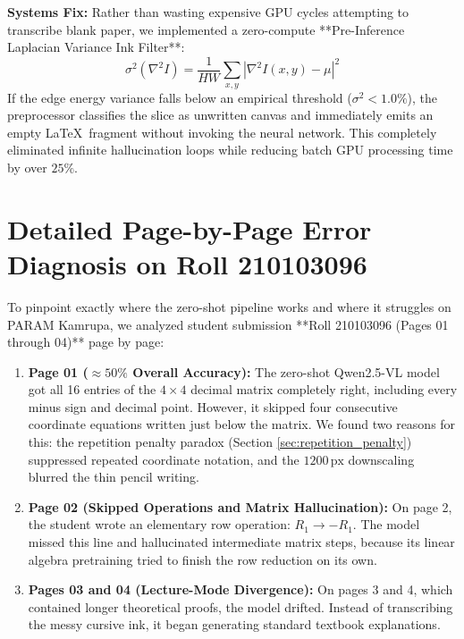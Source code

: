 \textbf{Systems Fix:} Rather than wasting expensive GPU cycles attempting to transcribe blank paper, we implemented a zero-compute **Pre-Inference Laplacian Variance Ink Filter**:
\begin{equation}
\sigma^2(\nabla^2 I) = \frac{1}{HW} \sum_{x,y} \left| \nabla^2 I(x,y) - \mu \right|^2
\end{equation}
If the edge energy variance falls below an empirical threshold ($\sigma^2 < 1.0\%$), the preprocessor classifies the slice as unwritten canvas and immediately emits an empty \LaTeX\ fragment without invoking the neural network. This completely eliminated infinite hallucination loops while reducing batch GPU processing time by over $25\%$.

\section{Detailed Page-by-Page Error Diagnosis on Roll 210103096}
\label{sec:zero_shot_diagnosis}

To pinpoint exactly where the zero-shot pipeline works and where it struggles on PARAM Kamrupa, we analyzed student submission **Roll 210103096 (Pages 01 through 04)** page by page:

\begin{enumerate}
    \item \textbf{Page 01 ($\approx 50\%$ Overall Accuracy):} The zero-shot Qwen2.5-VL model got all 16 entries of the $4 \times 4$ decimal matrix completely right, including every minus sign and decimal point. However, it skipped four consecutive coordinate equations written just below the matrix. We found two reasons for this: the repetition penalty paradox (Section \ref{sec:repetition_penalty}) suppressed repeated coordinate notation, and the $1200\,\text{px}$ downscaling blurred the thin pencil writing.
    \item \textbf{Page 02 (Skipped Operations and Matrix Hallucination):} On page 2, the student wrote an elementary row operation: $R_1 \to -R_1$. The model missed this line and hallucinated intermediate matrix steps, because its linear algebra pretraining tried to finish the row reduction on its own.
    \item \textbf{Pages 03 and 04 (Lecture-Mode Divergence):} On pages 3 and 4, which contained longer theoretical proofs, the model drifted. Instead of transcribing the messy cursive ink, it began generating standard textbook explanations.
\end{enumerate}

